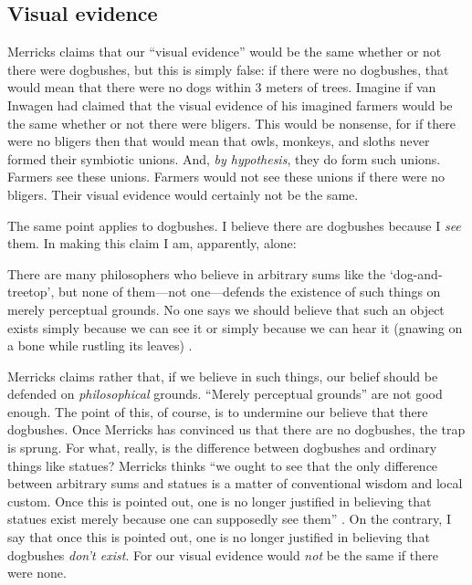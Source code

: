 \documentclass[11pt]{article}
\newenvironment{squote}{%
\begin{spacing}{1}
       	\begin{list}{}{%
\setlength{\labelwidth}{0pt}%
\rightmargin\leftmargin%
}
\item\relax
}{%
\end{list}%
\end{spacing}
}
\begin{document}
\begin{spacing}{1.25}
\subsection{Visual evidence}
\label{visual}
Merricks claims that our ``visual evidence'' would be the same whether
or not there were dogbushes, but this is simply false: if there were
no dogbushes, that would mean that there were no dogs within 3 meters
of trees.  Imagine if van Inwagen had claimed that the visual evidence
of his imagined farmers would be the same whether or not there were
bligers.  This would be nonsense, for if there were no bligers then
that would mean that owls, monkeys, and sloths never formed their
symbiotic unions.  And, {\em by hypothesis}, they do form such
unions.  Farmers see these unions.  Farmers would not see these unions
if there were no bligers.  Their visual evidence would certainly not
be the same.

The same point applies to dogbushes.  I believe there are dogbushes
because I {\em see} them.  In making this claim I am, apparently,
alone:

\begin{squote}
There are many philosophers who believe in arbitrary sums like the
`dog-and-treetop', but none of them---not one---defends the existence
of such things on merely perceptual grounds. No one says we should
believe that such an object exists simply because we can see it or
simply because we can hear it (gnawing on a bone while rustling its
leaves) \citep[74]{merricks2001a}.
\end{squote}

Merricks claims rather that, if we believe in such things, our belief
should be defended on {\em philosophical} grounds.  ``Merely
perceptual grounds'' are not good enough.  The point of this, of
course, is to undermine our believe that there dogbushes.  Once
Merricks has convinced us that there are no dogbushes, the trap is
sprung.  For what, really, is the difference between dogbushes and
ordinary things like statues?  Merricks thinks ``we ought to see that
the only difference between arbitrary sums and statues is a matter of
conventional wisdom and local custom.  Once this is pointed out, one
is no longer justified in believing that statues exist merely because
one can supposedly see them'' \citeyearpar[75]{merricks2001a}.  On the
contrary, I say that once this is pointed out, one is no longer
justified in believing that dogbushes {\em don't exist}.  For our
visual evidence would {\em not} be the same if there were none.


\end{spacing}
\end{document}
